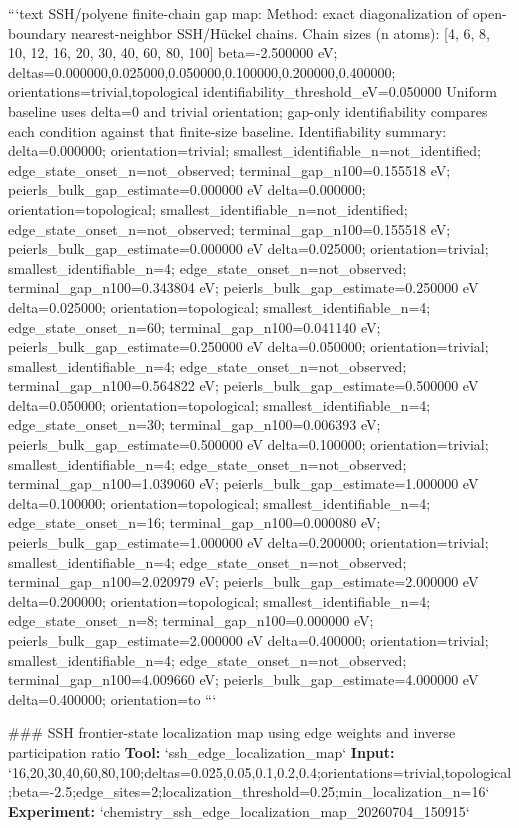 \documentclass[11pt,a4paper]{article}
\begin{document}
```text
SSH/polyene finite-chain gap map:
  Method: exact diagonalization of open-boundary nearest-neighbor SSH/Hückel chains.
  Chain sizes (n atoms): [4, 6, 8, 10, 12, 16, 20, 30, 40, 60, 80, 100]
  beta=-2.500000 eV; deltas=0.000000,0.025000,0.050000,0.100000,0.200000,0.400000; orientations=trivial,topological
  identifiability\_threshold\_eV=0.050000
  Uniform baseline uses delta=0 and trivial orientation; gap-only identifiability compares each condition against that finite-size baseline.
  Identifiability summary:
  delta=0.000000; orientation=trivial; smallest\_identifiable\_n=not\_identified; edge\_state\_onset\_n=not\_observed; terminal\_gap\_n100=0.155518 eV; peierls\_bulk\_gap\_estimate=0.000000 eV
  delta=0.000000; orientation=topological; smallest\_identifiable\_n=not\_identified; edge\_state\_onset\_n=not\_observed; terminal\_gap\_n100=0.155518 eV; peierls\_bulk\_gap\_estimate=0.000000 eV
  delta=0.025000; orientation=trivial; smallest\_identifiable\_n=4; edge\_state\_onset\_n=not\_observed; terminal\_gap\_n100=0.343804 eV; peierls\_bulk\_gap\_estimate=0.250000 eV
  delta=0.025000; orientation=topological; smallest\_identifiable\_n=4; edge\_state\_onset\_n=60; terminal\_gap\_n100=0.041140 eV; peierls\_bulk\_gap\_estimate=0.250000 eV
  delta=0.050000; orientation=trivial; smallest\_identifiable\_n=4; edge\_state\_onset\_n=not\_observed; terminal\_gap\_n100=0.564822 eV; peierls\_bulk\_gap\_estimate=0.500000 eV
  delta=0.050000; orientation=topological; smallest\_identifiable\_n=4; edge\_state\_onset\_n=30; terminal\_gap\_n100=0.006393 eV; peierls\_bulk\_gap\_estimate=0.500000 eV
  delta=0.100000; orientation=trivial; smallest\_identifiable\_n=4; edge\_state\_onset\_n=not\_observed; terminal\_gap\_n100=1.039060 eV; peierls\_bulk\_gap\_estimate=1.000000 eV
  delta=0.100000; orientation=topological; smallest\_identifiable\_n=4; edge\_state\_onset\_n=16; terminal\_gap\_n100=0.000080 eV; peierls\_bulk\_gap\_estimate=1.000000 eV
  delta=0.200000; orientation=trivial; smallest\_identifiable\_n=4; edge\_state\_onset\_n=not\_observed; terminal\_gap\_n100=2.020979 eV; peierls\_bulk\_gap\_estimate=2.000000 eV
  delta=0.200000; orientation=topological; smallest\_identifiable\_n=4; edge\_state\_onset\_n=8; terminal\_gap\_n100=0.000000 eV; peierls\_bulk\_gap\_estimate=2.000000 eV
  delta=0.400000; orientation=trivial; smallest\_identifiable\_n=4; edge\_state\_onset\_n=not\_observed; terminal\_gap\_n100=4.009660 eV; peierls\_bulk\_gap\_estimate=4.000000 eV
  delta=0.400000; orientation=to
```

\#\#\# SSH frontier-state localization map using edge weights and inverse participation ratio
\textbf{Tool:} `ssh\_edge\_localization\_map`
\textbf{Input:} `16,20,30,40,60,80,100;deltas=0.025,0.05,0.1,0.2,0.4;orientations=trivial,topological;beta=-2.5;edge\_sites=2;localization\_threshold=0.25;min\_localization\_n=16`
\textbf{Experiment:} `chemistry\_ssh\_edge\_localization\_map\_20260704\_150915`
\end{document}
